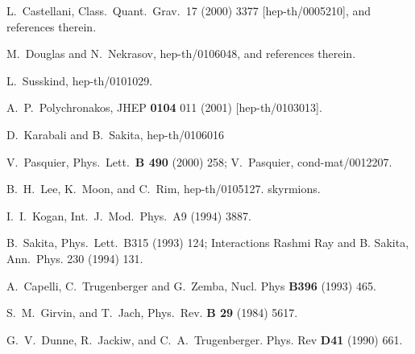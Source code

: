 \documentclass[a4paper,12pt]{article}
\begin{document}
\newpage
\begin{thebibliography}{bib}
  
L.~Castellani, Class.~Quant.~Grav.~17 (2000)
3377
  [hep-th/0005210], and references therein.
  
M.~Douglas and N.~Nekrasov, hep-th/0106048, and
references
  therein.
  
L.~Susskind, hep-th/0101029.
  
A.~P.~Polychronakos, JHEP {\bf 0104} 011 (2001)
  [hep-th/0103013].
  
D.~Karabali and B.~Sakita, hep-th/0106016
  
V.~Pasquier, Phys.~Lett.~{\bf B 490} (2000) 258;
  V.~Pasquier, cond-mat/0012207.
  
B.~H.~Lee, K.~Moon, and C.~Rim, hep-th/0105127.
skyrmions.
  
I.~I.~Kogan, Int.~J.~Mod.~Phys.~A9 (1994) 3887.
  
B.~Sakita, Phys.~Lett.~B315 (1993) 124;
Interactions 
  Rashmi Ray and B. Sakita, Ann.~Phys. 230 (1994) 131.
  
A.~Capelli, C.~Trugenberger and G.~Zemba, Nucl. Phys
{\bf
    B396} (1993) 465.
  
S.~M.~Girvin, and T.~Jach, Phys.~Rev. {\bf B 29} (1984)
  5617.
  
G.~V.~Dunne, R.~Jackiw, and C.~A.~Trugenberger.
Phys.
  Rev {\bf D41} (1990) 661.
  

\end{thebibliography}
\end{document}
